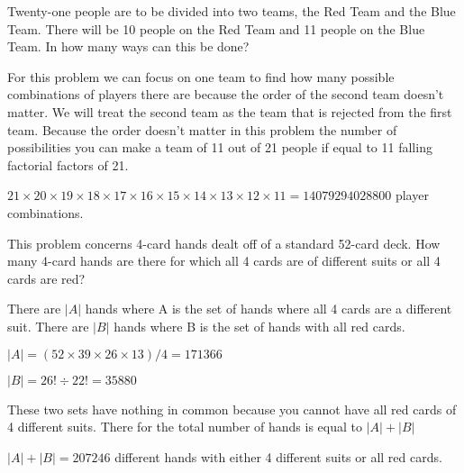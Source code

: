 \documentclass{article}
\begin{document}
\begin{description}
\item[Exercises for Section 3.3]

\item[12.] Twenty-one people are to be divided into two teams, the Red
  Team and the Blue Team.  There will be 10 people on the Red Team and
  11 people on the Blue Team.  In how many ways can this be done?
\item For this problem we can focus on one team to find how many possible combinations of players there are because the order of the second team doesn't matter. We will treat the second team as the team that is rejected from the first team. Because the order doesn't matter in this problem the number of possibilities you can make a team of 11 out of 21 people if equal to 11 falling factorial factors of 21.
\item $21\times 20\times 19\times  18\times 17\times 16\times 15\times 14\times 13\times 12\times 11 = 14079294028800$ player combinations.
\item[Exercises for Section 3.5]


\item[8.] This problem concerns 4-card hands dealt off of a standard
  52-card deck.  How many 4-card hands are there for which all 4 cards
  are of different suits or all 4 cards are red?
\item There are $|A|$ hands where A is the set of hands where all 4 cards are a different suit. There are $|B|$ hands where B is the set of hands with all red cards.
\item $|A| = (52\times 39\times 26\times 13)/4 = 171366$
\item $|B| = 26!\div 22! = 35880$
\item These two sets have nothing in common because you cannot have all red cards of 4 different suits. There for the total number of hands is equal to $|A|+|B|$
\item$|A|+|B| = 207246$ different hands with either 4 different suits or all red cards. 



\end{description}
\end{document}
